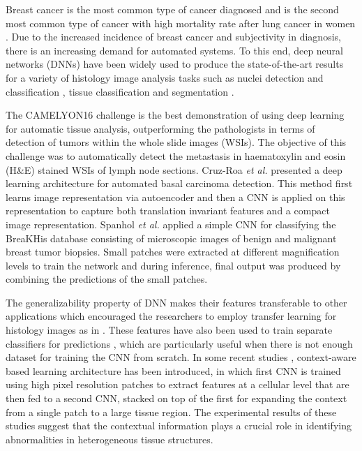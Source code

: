 \documentclass[runningheads,a4paper]{llncs}
\begin{document}
Breast cancer is the most common type of cancer diagnosed and is the second most common type of cancer with high mortality rate after lung cancer in women \cite{siegel2016cancer}. Due to the increased incidence of breast cancer and subjectivity in diagnosis, there is an increasing demand for automated systems. To this end, deep neural networks (DNNs) have been widely used to produce the state-of-the-art results for a variety of histology image analysis tasks such as nuclei detection and classification \cite{sirinukunwattana2016locality}, tissue classification \cite{cruz2014automatic,wang2016deep} and segmentation \cite{chen2016dcan,bejnordi2017diagnostic}. 

The CAMELYON16 challenge \cite{bejnordi2017diagnostic} is the best demonstration of using deep learning for automatic tissue analysis, outperforming the pathologists in terms of detection of tumors within the whole slide images (WSIs). The objective of this challenge was to automatically detect the metastasis in haematoxylin and eosin (H\&E) stained WSIs of lymph node sections. Cruz-Roa \emph{et al.} \cite{cruz2014automatic} presented a deep learning architecture for automated basal carcinoma detection. This method first learns image representation via autoencoder and then a CNN is applied on this representation to capture both translation invariant features and a compact image representation. Spanhol \emph{et al.} \cite{spanhol2016breast} applied a simple CNN for classifying the BreaKHis database \cite{spanhol2016dataset} consisting of microscopic images of benign and malignant breast tumor biopsies. Small patches were extracted at different magnification levels to train the network and during inference, final output was produced by combining the predictions of the small patches.


The generalizability property of DNN makes their features transferable to other applications which encouraged the researchers to employ transfer learning for histology images as in \cite{chen2016dcan,bayramoglu2016transfer,han2017breast}. These features have also been used to train separate classifiers for predictions \cite{xu2017large,valkonen2017dual,xu2015deep,araujo2017classification}, which are particularly useful when there is not enough dataset for training the CNN from scratch. In some recent studies \cite{agarwalla2017representation,bejnordi2017context}, context-aware based learning architecture has been introduced, in which first CNN is trained using high pixel resolution patches to extract features at a cellular level that are then fed to a second CNN, stacked on top of the first for expanding the context from a single patch to a large tissue region. The experimental results of these studies suggest that the contextual information plays a crucial role in identifying abnormalities in heterogeneous tissue structures.
\end{document}
